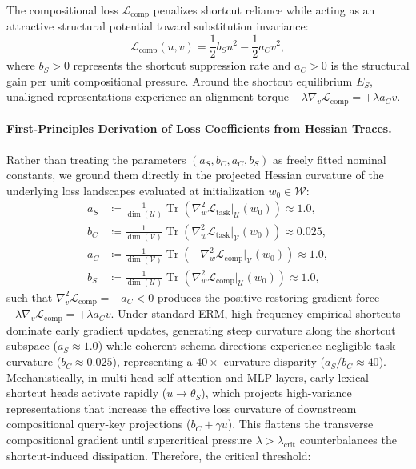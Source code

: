 \documentclass{article}
\theoremstyle{plain}
\theoremstyle{definition}
\DeclareMathOperator{\Tr}{Tr}
\begin{document}
The compositional loss $\mathcal{L}_{\text{comp}}$ penalizes shortcut reliance while acting as an attractive structural potential toward substitution invariance:
\begin{equation}
    \mathcal{L}_{\text{comp}}(u, v) = \frac{1}{2} b_S u^2 - \frac{1}{2} a_C v^2,
    \label{eq:comp_loss}
\end{equation}
where $b_S > 0$ represents the shortcut suppression rate and $a_C > 0$ is the structural gain per unit compositional pressure. Around the shortcut equilibrium $E_S$, unaligned representations experience an alignment torque $-\lambda \nabla_v \mathcal{L}_{\text{comp}} = +\lambda a_C v$.

\paragraph{First-Principles Derivation of Loss Coefficients from Hessian Traces.}
Rather than treating the parameters $(a_S, b_C, a_C, b_S)$ as freely fitted nominal constants, we ground them directly in the projected Hessian curvature of the underlying loss landscapes evaluated at initialization $w_0 \in \mathcal{W}$:
\begin{align}
    a_S &\coloneqq \frac{1}{\dim(\mathcal{U})} \Tr\left(\nabla_w^2 \mathcal{L}_{\text{task}}|_{\mathcal{U}}(w_0)\right) \approx 1.0, \label{eq:a_S_def} \\
    b_C &\coloneqq \frac{1}{\dim(\mathcal{V})} \Tr\left(\nabla_w^2 \mathcal{L}_{\text{task}}|_{\mathcal{V}}(w_0)\right) \approx 0.025, \label{eq:b_C_def} \\
    a_C &\coloneqq \frac{1}{\dim(\mathcal{V})} \Tr\left(-\nabla_w^2 \mathcal{L}_{\text{comp}}|_{\mathcal{V}}(w_0)\right) \approx 1.0, \label{eq:a_C_def} \\
    b_S &\coloneqq \frac{1}{\dim(\mathcal{U})} \Tr\left(\nabla_w^2 \mathcal{L}_{\text{comp}}|_{\mathcal{U}}(w_0)\right) \approx 1.0, \label{eq:b_S_def}
\end{align}
such that $\nabla_v^2 \mathcal{L}_{\text{comp}} = -a_C < 0$ produces the positive restoring gradient force $-\lambda \nabla_v \mathcal{L}_{\text{comp}} = +\lambda a_C v$. Under standard ERM, high-frequency empirical shortcuts dominate early gradient updates, generating steep curvature along the shortcut subspace ($a_S \approx 1.0$) while coherent schema directions experience negligible task curvature ($b_C \approx 0.025$), representing a $40\times$ curvature disparity ($a_S / b_C \approx 40$). Mechanistically, in multi-head self-attention and MLP layers, early lexical shortcut heads activate rapidly ($u \to \theta_S$), which projects high-variance representations that increase the effective loss curvature of downstream compositional query-key projections ($b_C + \gamma u$). This flattens the transverse compositional gradient until supercritical pressure $\lambda > \lambda_{\text{crit}}$ counterbalances the shortcut-induced dissipation. Therefore, the critical threshold:
\end{document}
